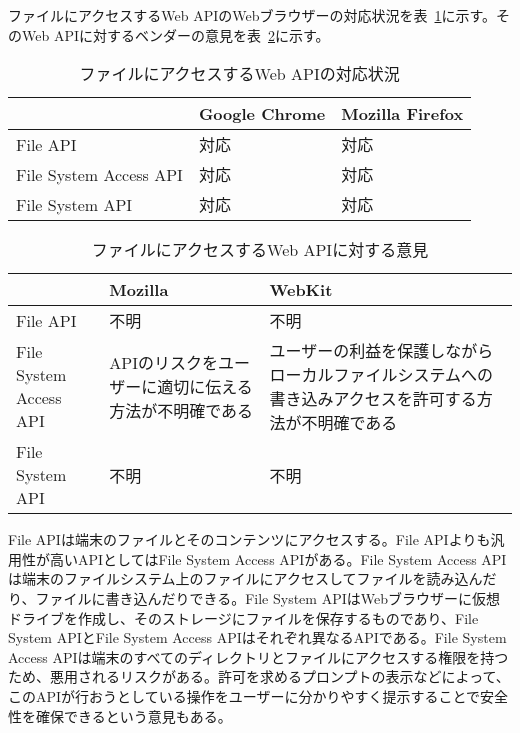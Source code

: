 ファイルにアクセスするWeb APIのWebブラウザーの対応状況を表~\ref{table:ファイルにアクセスするWeb APIの対応状況}に示す。そのWeb APIに対するベンダーの意見を表~\ref{table:ファイルにアクセスするWeb APIに対する意見}に示す。
\begin{table}
  \caption{ファイルにアクセスするWeb APIの対応状況}\label{table:ファイルにアクセスするWeb APIの対応状況}
  \centering
  \begin{tabular}{|p{13em}|p{8em}|p{8em}|}
    \hline
    & Google Chrome & Mozilla Firefox \\ \hline
    File API & \cellcolor{green!25}対応 & \cellcolor{green!25}対応 \\ \hline
    File System Access API & \cellcolor{green!25}対応 & \cellcolor{green!25}対応 \\ \hline
    File System API & \cellcolor{green!25}対応 & \cellcolor{green!25}対応 \\ \hline
  \end{tabular}
\end{table}
\begin{table}
  \caption{ファイルにアクセスするWeb APIに対する意見}
  \label{table:ファイルにアクセスするWeb APIに対する意見}
    \centering
    \begin{tabular}{|p{13em}|p{13em}|p{13em}|}
        \hline
        & Mozilla & WebKit \\ \hline
        File API & 不明 & 不明 \\ \hline
        File System Access API & \cellcolor{red!25}APIのリスクをユーザーに適切に伝える方法が不明確である\cite{MozillaFileSystemAccessAPI} & \cellcolor{red!25}ユーザーの利益を保護しながらローカルファイルシステムへの書き込みアクセスを許可する方法が不明確である~\cite{WebKitFileSystemAccessAPI} \\ \hline
        File System API & 不明 & 不明\\ \hline
    \end{tabular}
\end{table}
File APIは端末のファイルとそのコンテンツにアクセスする。File APIよりも汎用性が高いAPIとしてはFile System Access APIがある。File System Access APIは端末のファイルシステム上のファイルにアクセスしてファイルを読み込んだり、ファイルに書き込んだりできる。File System APIはWebブラウザーに仮想ドライブを作成し、そのストレージにファイルを保存するものであり、File System APIとFile System Access APIはそれぞれ異なるAPIである。File System Access APIは端末のすべてのディレクトリとファイルにアクセスする権限を持つため、悪用されるリスクがある。許可を求めるプロンプトの表示などによって、このAPIが行おうとしている操作をユーザーに分かりやすく提示することで安全性を確保できるという意見もある。

